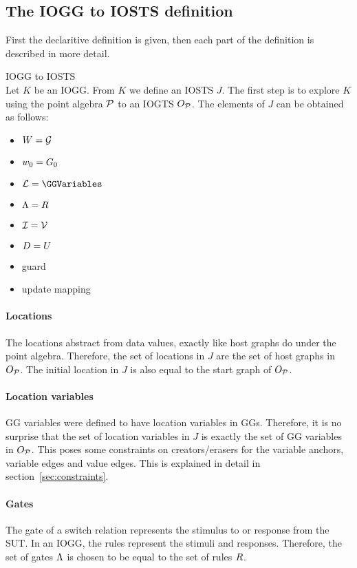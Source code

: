 \subsection{The IOGG to IOSTS definition} 
First the declaritive definition is given, then each part of the definition is described in more detail.
\vspace{10px}
\begin{definition} IOGG to IOSTS \\
Let $K$ be an IOGG. From $K$ we define an IOSTS $J$. The first step is to explore $K$ using the point algebra $\mathcal{P}$ to an IOGTS $O_{\mathcal{P}}$. The elements of $J$ can be obtained as follows:
\begin{itemize}
\item $W = \mathcal{G}$
\item $w_0 = G_0$
\item $\LocationVariables = \GGVariables$
\item $\Lambda = R$
\item $\mathcal{I} = \mathcal{V}$
\item $D = U$
\item guard
\item update mapping
\end{itemize}
\end{definition}

\paragraph*{Locations} The locations abstract from data values, exactly like host graphs do under the point algebra. Therefore, the set of locations in $J$ are the set of host graphs in $O_{\mathcal{P}}$. The initial location in $J$ is also equal to the start graph of $O_{\mathcal{P}}$.

\paragraph*{Location variables} GG variables were defined to have location variables in GGs. Therefore, it is no surprise that the set of location variables in $J$ is exactly the set of GG variables in $O_{\mathcal{P}}$. This poses some constraints on creators/erasers for the variable anchors, variable edges and value edges. This is explained in detail in section~\ref{sec:constraints}.

\paragraph*{Gates}
The gate of a switch relation represents the stimulus to or response from the SUT. In an IOGG, the rules represent the stimuli and responses. Therefore, the set of gates $\Lambda$ is chosen to be equal to the set of rules $R$.

